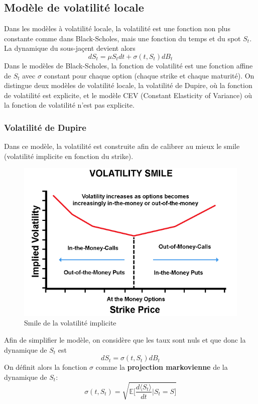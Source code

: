\documentclass[a4paper]{article}
\begin{document}
\subsection{Modèle de volatilité locale}

Dans les modèles à volatilité locale, la volatilité est une fonction non plus constante comme dans Black-Scholes, mais une fonction du temps et du spot $S_t$. La dynamique du sous-jaçent devient alors
\begin{equation*}
    dS_t = \mu S_t dt + \sigma(t, S_t) dB_t
\end{equation*}
Dans le modèles de Black-Scholes, la fonction de volatilité est une fonction affine de $S_t$ avec $\sigma$ constant pour chaque option (chaque strike et chaque maturité). On distingue deux modèles de volatilité locale, la volatilité de Dupire, où la fonction de volatilité est explicite, et le modèle CEV (Constant Elasticity of Variance) où la fonction de volatilité n'est pas explicite.
\subsubsection{Volatilité de Dupire}

Dans ce modèle, la volatilité est construite afin de calibrer au mieux le smile (volatilité implicite en fonction du strike).
\begin{figure}[H]
    \centering
    \includegraphics[scale=0.5]{volatility-smile.png}
    \caption{Smile de la volatilité implicite}
    \label{fig:enter-label}
\end{figure}
Afin de simplifier le modèle, on considère que les taux sont nuls et que donc la dynamique de $S_t$ est
\begin{equation*}
    dS_t = \sigma (t, S_t) dB_t
\end{equation*}
On définit alors la fonction $\sigma$ comme la \textbf{projection markovienne} de la dynamique de $S_t$:
\begin{equation}
    \sigma (t, S_t) = \sqrt{ \mathbb{E} \bigg[ \frac{d\langle S_t \rangle}{dt} \bigg| S_t = S \bigg] }
\end{equation}
\end{document}
